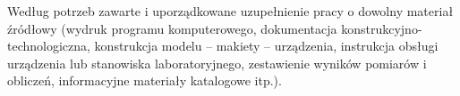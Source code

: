 \documentclass[12pt,twoside]{article}
\begin{document}
Według potrzeb zawarte i uporządkowane uzupełnienie pracy o dowolny materiał źródłowy (wydruk programu komputerowego, dokumentacja kons\-truk\-cyj\-no-\-tech\-no\-lo\-gicz\-na, konstrukcja modelu -- makiety -- urządzenia, instrukcja obsługi urządzenia lub stanowiska laboratoryjnego, zestawienie wyników pomiarów i obliczeń, informacyjne materiały katalogowe itp.).


\clearpage


\begin{thebibliography}{4}
\end{thebibliography}

\clearpage

\makesummary
\end{document}
